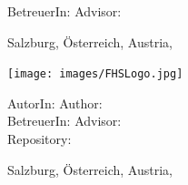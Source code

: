 \begin{titlepage}
{    
    \vspace*{1cm}
    
    \ifhcilanguagegerman BetreuerIn: \else Advisor: \fi
    \supervisor
    \\    
    
    \vfill
    
    Salzburg, \ifhcilanguagegerman Österreich, \else Austria, \fi  \thesisdate
    }

\else %

    \begin{center}
    
    \texttt{[image: images/FHSLogo.jpg]}


    \vspace*{4cm}
    
    \fontsize{20.79}{18pt}{\selectfont        
    	\textit{\textbf{\titlename}}
    }
    
    \vspace*{4cm}
    
    \fontsize{20.79}{18pt}{%
    \ifhcilanguagegerman
      \textbf{ \ifhcipaper Seminararbeit \else Bachelorarbeit \fi }
    \else
        \textbf{ \ifhcipaper Seminararbeit \else Bachelor Thesis \fi }
    \fi
    }
    
    
    \end{center}
    
    \vfill
    
    \ifhcilanguagegerman AutorIn: \else Author: \fi  \authorname  \\
    \ifhcilanguagegerman BetreuerIn: \else Advisor: \fi \advisor \\
    Repository: \thesisrepo \\
    
    Salzburg, \ifhcilanguagegerman Österreich, \else Austria, \fi \thesisdate
    
    
    

\fi

\end{titlepage}

